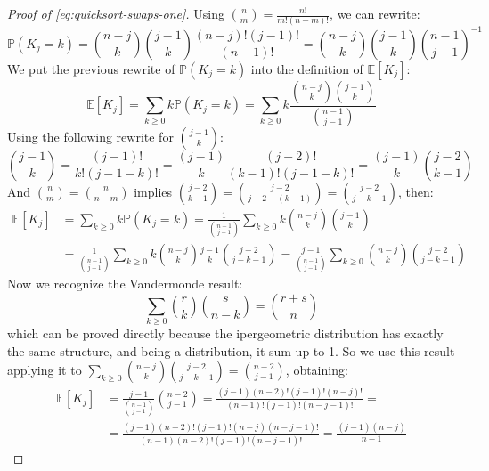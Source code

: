 \begin{proof}[Proof of \autoref{eq:quicksort-swaps-one}]
  Using ${{n}\choose{m}} =  \frac{n!}{m!(n-m)!} $, we can rewrite:
  \begin{displaymath}
    \mathbb{P}\left(K_j = k \right) =  {{n-j}\choose{k}}
    {{j-1}\choose{k}} \frac{(n-j)! (j-1)! }{(n-1)!} =  {{n-j}\choose{k}}
    {{j-1}\choose{k}} {{n-1}\choose{j-1}}^{-1}
  \end{displaymath}
  We put the previous rewrite of $\mathbb{P}\left(K_j = k \right)$ into
  the definition of $\mathbb{E} \left[ K_j \right]$:
  \begin{displaymath}
    \mathbb{E} \left[ K_j \right] = \sum_{k \geq 0}{k \mathbb{P}\left(
        K_j = k      \right) }  = \sum_{k \geq 0}{k \frac{{{n-j}\choose{k}}
        {{j-1}\choose{k}}}{{{n-1}\choose{j-1}}}}
  \end{displaymath}
  Using the following rewrite for ${{j-1}\choose{k}}$:
  \begin{displaymath}
    {{j-1}\choose{k}} =  \frac{(j-1)!}{k!(j-1-k)!} =
    \frac{(j-1)}{k} \frac{(j-2)!}{(k-1)!(j-1-k)!} =
    \frac{(j-1)}{k}{{j-2}\choose{k-1}}
  \end{displaymath}
  And ${{n}\choose{m}} = {{n}\choose{n-m}}$ implies ${{j-2}\choose{k-1}}
  = {{j-2}\choose{j-2 -(k-1)}} = {{j-2}\choose{j -k-1}}$, then:
  \begin{displaymath}
    \begin{split}
      \mathbb{E} \left[ K_j \right] &= \sum_{k \geq 0}{k
        \mathbb{P}\left( K_j = k \right) } =
      \frac{1}{{{n-1}\choose{j-1}}} \sum_{k \geq 0}{k
        {{n-j}\choose{k}} {{j-1}\choose{k}}} \\
      &= \frac{1}{{{n-1}\choose{j-1}}} \sum_{k \geq 0}{k
        {{n-j}\choose{k}}  \frac{j-1}{k}{{j-2}\choose{j-k-1}}}
      = \frac{j-1}{{{n-1}\choose{j-1}}} \sum_{k \geq 0}{
        {{n-j}\choose{k}} {{j-2}\choose{j-k-1}}}
    \end{split}
  \end{displaymath}
  Now we recognize the Vandermonde result:
  \begin{displaymath}
    \sum_{k \geq 0}{{{r}\choose{k}} {{s}\choose{n-k}}  } =
    {{r + s}\choose{n}}
  \end{displaymath}
  which can be proved directly because the ipergeometric distribution
  has exactly the same structure, and being a distribution, it sum up
  to 1. So we use this result applying it to $\sum_{k \geq 0}{
    {{n-j}\choose{k}} {{j-2}\choose{j-k-1}}} = {{n-2}\choose{j-1}} $,
  obtaining:
  \begin{displaymath}
    \begin{split}
      \mathbb{E} \left[ K_j \right] &= \frac{j-1}{{{n-1}\choose{j-1}}}
      {{n-2}\choose{j-1}} =
      \frac{(j-1)(n-2)!(j-1)!(n-j)!}{(n-1)!(j-1)!(n-j-1)!}=\\
      &=\frac{(j-1)(n-2)!(j-1)!(n-j)(n-j-1)!}
      {(n-1)(n-2)!(j-1)!(n-j-1)!}= \frac{(j-1)(n-j)}{n-1}
    \end{split}
  \end{displaymath}
\end{proof}
